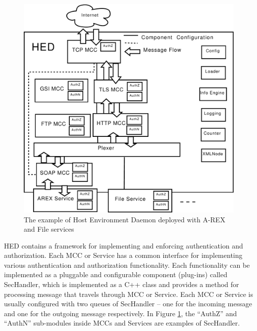 \documentclass[conference]{IEEEtran}
\begin{document}
\begin{figure}
\includegraphics[width=0.9\columnwidth]{HED.pdf}
\caption{The example of Host Environment Daemon deployed with A-REX and File services}
\label{fig:HED}
\end{figure}
HED contains a framework for implementing and enforcing authentication and authorization. Each MCC or Service has a common interface for implementing various authentication and authorization functionality. Each functionality can be implemented as a pluggable and configurable component (plug-ins) called SecHandler, which is implemented as a C++ class and provides a method for processing message that travels through MCC or Service. Each MCC or Service is usually configured with two queues of SecHandler -- one for the incoming message and one for the outgoing message respectively. In Figure \ref{fig:HED}, the ``AuthZ'' and ``AuthN'' sub-modules inside MCCs and Services are examples of SecHandler.

\end{document}
